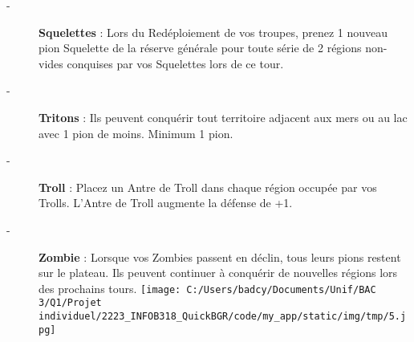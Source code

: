 \documentclass{scrartcl}%
\begin{document}
\begin{description}
%
\item[{-} ]%
%
\textcolor{mygreen}{%
\textbf{Squelettes}%
}%
\textit{ }%
 : Lors du Redéploiement de vos troupes, prenez 1 nouveau pion Squelette de la réserve générale pour toute série de 2 régions non{-}vides conquises par vos Squelettes lors de ce tour.
%
\item[{-} ]%
%
\textcolor{mygreen}{%
\textbf{Tritons}%
}%
\textit{ }%
 : Ils peuvent conquérir tout territoire adjacent aux mers ou au lac avec 1 pion de moins. Minimum 1 pion.
%
\item[{-} ]%
%
\textcolor{mygreen}{%
\textbf{Troll}%
}%
\textit{ }%
 : Placez un Antre de Troll dans chaque région occupée par vos Trolls. L’Antre de Troll augmente la défense de +1.
%
\item[{-} ]%
%
\textcolor{mygreen}{%
\textbf{Zombie}%
}%
\textit{ }%
 : Lorsque vos Zombies passent en déclin, tous leurs pions restent sur le plateau. Ils peuvent continuer à conquérir de nouvelles régions lors des prochains tours.%
\texttt{[image: C:/Users/badcy/Documents/Unif/BAC 3/Q1/Projet individuel/2223\_INFOB318\_QuickBGR/code/my\_app/static/img/tmp/5.jpg]}%

%

%
\end{description}

%
\end{document}
